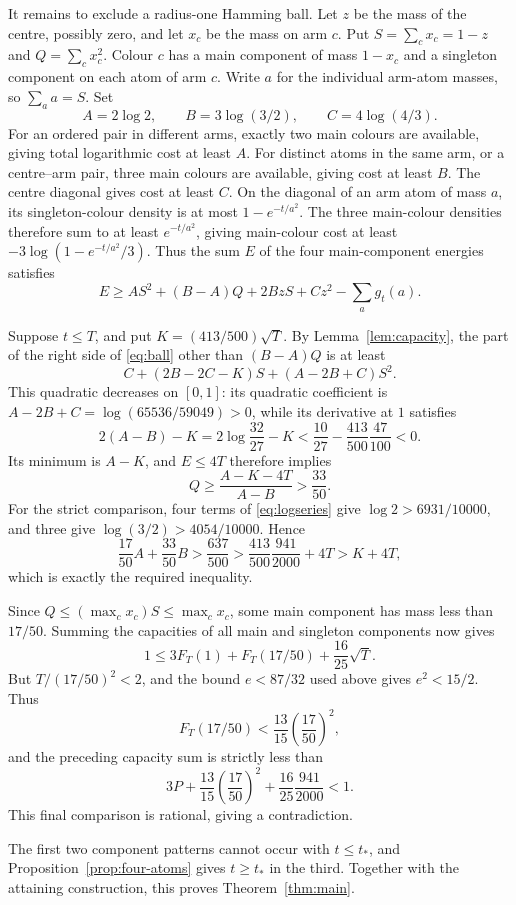 \documentclass[11pt]{article}
\begin{document}
It remains to exclude a radius-one Hamming ball. Let $z$ be the mass of
the centre, possibly zero, and let $x_c$ be the mass on arm $c$.
Put $S=\sum_c x_c=1-z$ and $Q=\sum_c x_c^2$. Colour $c$ has a main
component of mass $1-x_c$ and a singleton component on each atom of
arm $c$. Write $a$ for the individual arm-atom masses, so $\sum_a a=S$.
Set
\[
 A=2\log2,\qquad B=3\log(3/2),\qquad C=4\log(4/3).
\]
For an ordered pair in different arms, exactly two main colours are
available, giving total logarithmic cost at least $A$. For distinct atoms
in the same arm, or a centre--arm pair, three main colours are available,
giving cost at least $B$. The centre diagonal gives cost at least $C$.
On the diagonal of an arm atom of mass $a$, its singleton-colour density
is at most $1-e^{-t/a^2}$. The three main-colour densities therefore sum
to at least $e^{-t/a^2}$, giving main-colour cost at least
$-3\log(1-e^{-t/a^2}/3)$. Thus the sum $E$ of the four main-component
energies satisfies
\begin{equation}\label{eq:ball}
 E\ge AS^2+(B-A)Q+2BzS+Cz^2-\sum_a g_t(a).
\end{equation}

Suppose $t\le T$, and put $K=(413/500)\sqrt T$. By
Lemma~\ref{lem:capacity}, the part of the right side of \eqref{eq:ball}
other than $(B-A)Q$ is at least
\[
 C+(2B-2C-K)S+(A-2B+C)S^2.
\]
This quadratic decreases on $[0,1]$: its quadratic coefficient is
$A-2B+C=\log(65536/59049)>0$, while its derivative at $1$ satisfies
\[
 2(A-B)-K=2\log\frac{32}{27}-K
 <\frac{10}{27}-\frac{413}{500}\frac{47}{100}<0.
\]
Its minimum is $A-K$, and $E\le4T$ therefore implies
\[
 Q\ge\frac{A-K-4T}{A-B}>\frac{33}{50}.
\]
For the strict comparison, four terms of \eqref{eq:logseries} give
$\log2>6931/10000$, and three give $\log(3/2)>4054/10000$. Hence
\[
 \frac{17}{50}A+\frac{33}{50}B>\frac{637}{500}
 >\frac{413}{500}\frac{941}{2000}+4T>K+4T,
\]
which is exactly the required inequality.

Since $Q\le(\max_c x_c)S\le\max_c x_c$, some main component has
mass less than $17/50$. Summing the capacities of all main and singleton
components now gives
\[
 1\le3F_T(1)+F_T(17/50)+\frac{16}{25}\sqrt T.
\]
But $T/(17/50)^2<2$, and the bound $e<87/32$ used above gives
$e^2<15/2$. Thus
\[
 F_T(17/50)<\frac{13}{15}\left(\frac{17}{50}\right)^2,
\]
and the preceding capacity sum is strictly less than
\[
 3P+\frac{13}{15}\left(\frac{17}{50}\right)^2
       +\frac{16}{25}\frac{941}{2000}<1.
\]
This final comparison is rational, giving a contradiction.

The first two component patterns cannot occur with $t\le t_*$, and
Proposition~\ref{prop:four-atoms} gives $t\ge t_*$ in the third.
Together with the attaining construction, this proves
Theorem~\ref{thm:main}.
\end{document}
